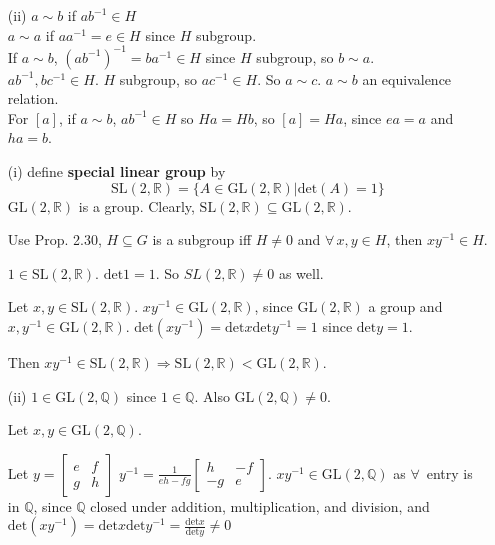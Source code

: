 \documentclass[twoside,landscape]{amsart}
\theoremstyle{plain}
\theoremstyle{definition}
\theoremstyle{remark}
\newcommand{\exercisehead}[1]
  { \smallskip
   \noindent{\small\bf Exercise #1.}
  }
\begin{document}
\begin{multicols*}{2}
\begin{enumerate}
\item[(ii)] $a\sim b$ if $ab^{-1} \in H$ \\
$a\sim a$ if $aa^{-1} = e \in H$ since $H$ subgroup.  \\
If $a\sim b$, $(ab^{-1})^{-1} = ba^{-1} \in H$ since $H$ subgroup, so $b\sim a$.  \\
$ab^{-1}, bc^{-1} \in H$.  $H$ subgroup, so $ac^{-1} \in H$.  So $a\sim c$.  $a\sim b$ an equivalence relation.  \\

For $[a]$, if $a\sim b$, $ab^{-1} \in H$ so $Ha= Hb$, so $[a] = Ha$, since $ea =a$ and $ha =b$.  
\end{enumerate}

\exercisehead{2.30}

\begin{enumerate}
  \item[(i)] define \textbf{special linear group} by 
\[
\text{SL}(2, \mathbb{R}) = \lbrace A \in \text{GL}(2,\mathbb{R}) | \text{det}(A) = 1 \rbrace
\]
$\text{GL}(2,\mathbb{R})$ is a group.  Clearly, $\text{SL}(2,\mathbb{R}) \subseteq \text{GL}(2,\mathbb{R})$.  

Use Prop. 2.30, $H \subseteq G$ is a subgroup iff $H \neq 0$ and $\forall \, x,y \in H$, then $xy^{-1} \in H$.  

$1 \in \text{SL}(2,\mathbb{R})$.  $\text{det}1 =1$.  So $SL(2,\mathbb{R}) \neq 0$ as well.  

Let $x,y \in \text{SL}(2,\mathbb{R})$.  $xy^{-1} \in \text{GL}(2,\mathbb{R})$, since $\text{GL}(2,\mathbb{R})$ a group and $x,y^{-1} \in \text{GL}(2,\mathbb{R})$.  $\text{det}(xy^{-1}) = \text{det}x \text{det}y^{-1} = 1$ since $\text{det}y=1$.  

Then $xy^{-1} \in \text{SL}(2,\mathbb{R}) \Longrightarrow \text{SL}(2,\mathbb{R}) < \text{GL}(2,\mathbb{R})$.  



\item[(ii)] $1 \in \text{GL}(2,\mathbb{Q})$ since $1\in \mathbb{Q}$.  Also $\text{GL}(2,\mathbb{Q}) \neq 0$.  

Let $x,y \in \text{GL}(2,\mathbb{Q})$.  

Let $y = \left[ \begin{matrix} e & f \\
    g & h \end{matrix} \right]$ $y^{-1} = \frac{1}{ eh - fg} \left[ \begin{matrix} h & -f \\
    -g & e \end{matrix} \right]$.  $xy^{-1} \in \text{GL}(2,\mathbb{Q})$ as $\forall \, $ entry is in $\mathbb{Q}$, since $\mathbb{Q}$ closed under addition, multiplication, and division, and $\text{det}(xy^{-1}) = \text{det}x \text{det}y^{-1} = \frac{ \text{det}x }{ \text{det}y} \neq 0$
\end{enumerate}


\end{multicols*}
\end{document}
